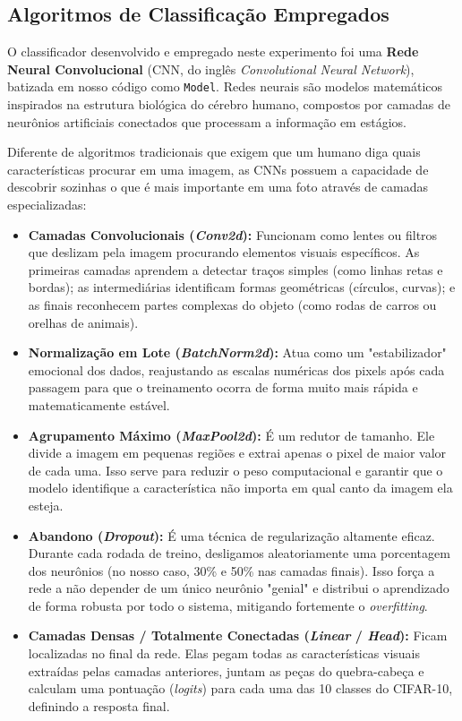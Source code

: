 \documentclass[12pt,a4paper]{article}
\begin{document}
\subsection{Algoritmos de Classificação Empregados}
O classificador desenvolvido e empregado neste experimento foi uma \textbf{Rede Neural Convolucional} (CNN, do inglês \textit{Convolutional Neural Network}), batizada em nosso código como \texttt{Model}. Redes neurais são modelos matemáticos inspirados na estrutura biológica do cérebro humano, compostos por camadas de neurônios artificiais conectados que processam a informação em estágios.

Diferente de algoritmos tradicionais que exigem que um humano diga quais características procurar em uma imagem, as CNNs possuem a capacidade de descobrir sozinhas o que é mais importante em uma foto através de camadas especializadas:
\begin{itemize}
    \item \textbf{Camadas Convolucionais (\textit{Conv2d}):} Funcionam como lentes ou filtros que deslizam pela imagem procurando elementos visuais específicos. As primeiras camadas aprendem a detectar traços simples (como linhas retas e bordas); as intermediárias identificam formas geométricas (círculos, curvas); e as finais reconhecem partes complexas do objeto (como rodas de carros ou orelhas de animais).
    \item \textbf{Normalização em Lote (\textit{BatchNorm2d}):} Atua como um "estabilizador" emocional dos dados, reajustando as escalas numéricas dos pixels após cada passagem para que o treinamento ocorra de forma muito mais rápida e matematicamente estável.
    \item \textbf{Agrupamento Máximo (\textit{MaxPool2d}):} É um redutor de tamanho. Ele divide a imagem em pequenas regiões e extrai apenas o pixel de maior valor de cada uma. Isso serve para reduzir o peso computacional e garantir que o modelo identifique a característica não importa em qual canto da imagem ela esteja.
    \item \textbf{Abandono (\textit{Dropout}):} É uma técnica de regularização altamente eficaz. Durante cada rodada de treino, desligamos aleatoriamente uma porcentagem dos neurônios (no nosso caso, 30\% e 50\% nas camadas finais). Isso força a rede a não depender de um único neurônio "genial" e distribui o aprendizado de forma robusta por todo o sistema, mitigando fortemente o \textit{overfitting}.
    \item \textbf{Camadas Densas / Totalmente Conectadas (\textit{Linear} / \textit{Head}):} Ficam localizadas no final da rede. Elas pegam todas as características visuais extraídas pelas camadas anteriores, juntam as peças do quebra-cabeça e calculam uma pontuação (\textit{logits}) para cada uma das 10 classes do CIFAR-10, definindo a resposta final.
\end{itemize}
\end{document}
